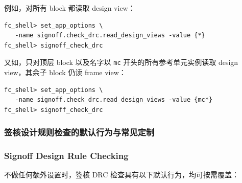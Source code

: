 例如，对所有 block 都读取 design view：
\begin{lstlisting}
fc_shell> set_app_options \
   -name signoff.check_drc.read_design_views -value {*}
fc_shell> signoff_check_drc
\end{lstlisting}

又如，只对顶层 block 以及名字以 \texttt{mc} 开头的所有参考单元实例读取 design view，其余子 block 仍读 frame view：
\begin{lstlisting}
fc_shell> set_app_options \
   -name signoff.check_drc.read_design_views -value {mc*}
fc_shell> signoff_check_drc
\end{lstlisting}

\subsubsection{签核设计规则检查的默认行为与常见定制}
\subsubsection*{Signoff Design Rule Checking}

不做任何额外设置时，签核 DRC 检查具有以下默认行为，均可按需覆盖：

